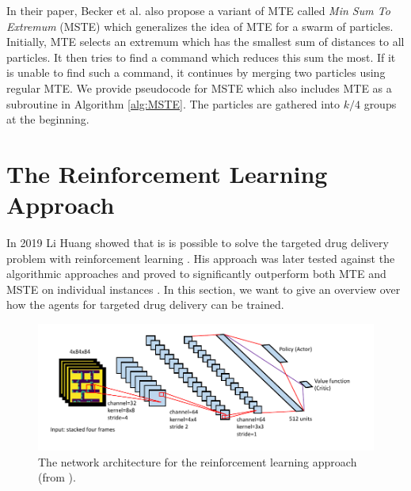 In their paper, Becker et al. also propose a variant of MTE called \textit{Min Sum To Extremum} (MSTE) which generalizes the idea of MTE for a swarm of particles. Initially, MTE selects an extremum which has the smallest sum of distances to all particles. It then tries to find a command which reduces this sum the most. If it is unable to find such a command, it continues by merging two particles using regular MTE. We provide pseudocode for MSTE which also includes MTE as a subroutine in Algorithm \ref{alg:MSTE}. The particles are gathered into $k/4$ groups at the beginning.

\section{The Reinforcement Learning Approach} \label{sec:TDDRL}
In 2019 Li Huang showed that is is possible to solve the targeted drug delivery problem with reinforcement learning \cite{huang2019}. His approach was later tested against the algorithmic approaches and proved to significantly outperform both MTE and MSTE on individual instances \cite{becker2020}. In this section, we want to give an overview over how the agents for targeted drug delivery can be trained.

\begin{figure}[ht]
    
    \begin{center}
        \includegraphics[clip, width=0.95\columnwidth]{figures/drugdelivery/Network_Architecture.pdf}
    \end{center}
    
    \caption[Network Architecture for the RL Approach]{The network architecture for the reinforcement learning approach (from \cite{huang2019}).}
    \label{fig:huang_network_architecture}
\end{figure}


